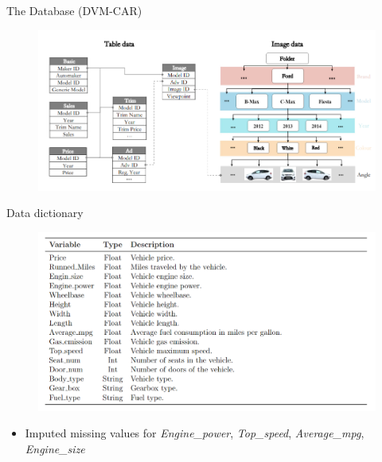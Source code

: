 \documentclass{beamer}
\begin{document}
    \begin{frame}{The Database (DVM-CAR)} 
        
        \begin{figure}
         
        \includegraphics[width=1\linewidth]{general_data_tables.png}
        \end{figure}
    \end{frame}

    \begin{frame}{Data dictionary}
        \begin{figure}
         
        \includegraphics[width=0.9\linewidth]{data dictionary.png}
        \end{figure}
    \begin{itemize}
        \item Imputed missing values for \textit{Engine\_power}, \textit{Top\_speed}, \textit{Average\_mpg}, \textit{Engine\_size} \\[0.2 cm]    
    \end{itemize}
    \end{frame}
\end{document}

